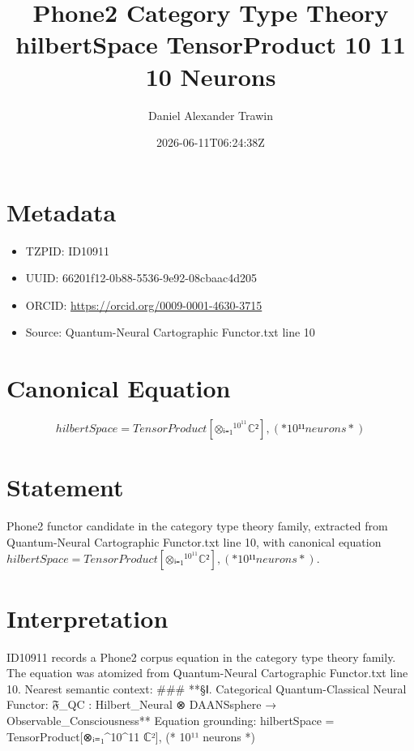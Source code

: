 \documentclass[11pt]{article}
\title{Phone2 Category Type Theory hilbertSpace TensorProduct 10 11 10 Neurons}
\author{Daniel Alexander Trawin}
\date{2026-06-11T06:24:38Z}
\begin{document}
\maketitle
\section*{Metadata}
\begin{itemize}
\item TZPID: ID10911
\item UUID: 66201f12-0b88-5536-9e92-08cbaac4d205
\item ORCID: \url{https://orcid.org/0009-0001-4630-3715}
\item Source: Quantum-Neural Cartographic Functor.txt line 10
\end{itemize}
\section*{Canonical Equation}
\[
hilbertSpace = TensorProduct[⊗ᵢ₌₁^{10^11} ℂ²], (* 10¹¹ neurons *)
\]
\section*{Statement}
Phone2 functor candidate in the category type theory family, extracted from Quantum-Neural Cartographic Functor.txt line 10, with canonical equation $hilbertSpace = TensorProduct[⊗ᵢ₌₁^{10^11} ℂ²], (* 10¹¹ neurons *)$.
\section*{Interpretation}
ID10911 records a Phone2 corpus equation in the category type theory family. The equation was atomized from Quantum-Neural Cartographic Functor.txt line 10. Nearest semantic context: ### **§Ⅰ. Categorical Quantum-Classical Neural Functor: 𝔉_QC : Hilbert_Neural ⊗ DAANSsphere → Observable_Consciousness** Equation grounding: hilbertSpace = TensorProduct[⊗ᵢ₌₁^{10^11} ℂ²], (* 10¹¹ neurons *)
\end{document}
